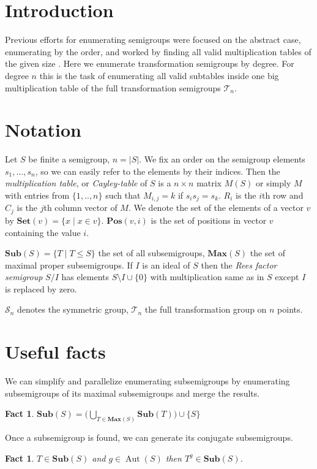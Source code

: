 \documentclass{amsart}
\newcommand{\cT}{{\mathcal T}}
\newcommand{\cS}{{\mathcal S}}
\newcommand{\Sub}{\mathbf{Sub}}
\newcommand{\Set}{\mathbf{Set}}
\newcommand{\Pos}{\mathbf{Pos}}
\newcommand{\Max}{\mathbf{Max}}
\DeclareMathOperator{\Aut}{Aut}
\theoremstyle{plain}
\newtheorem{fact}[theorem]{Fact}
\theoremstyle{definition}
\begin{document}
\tableofcontents
\section{Introduction}
Previous efforts for enumerating semigroups were focused on the abstract case, enumerating by the order, and worked by finding all valid multiplication tables of the given size \cite{monoidenum2009}.
Here we enumerate transformation semigroups by degree.
For degree $n$ this is the task of enumerating all valid subtables inside one big multiplication table of the  full transformation semigroups $\cT_n$.

\section{Notation}
Let $S$ be finite a semigroup, $n=|S|$.
We fix an order on the semigroup elements $s_1,\ldots, s_n$, so we can easily refer to the elements by their indices. 
Then the  \emph{multiplication table}, or \emph{Cayley-table} of $S$ is a $n\times n$ matrix $M(S)$ or simply $M$ with entries from $\{1,..,n\}$ such that $M_{i,j}=k$ if $s_is_j=s_k$.
$R_i$ is the $i$th row and $C_j$ is the $j$th column vector of $M$.
We denote the set of the elements of a vector $v$ by $\Set(v)=\{x\mid x\in v\}$.
$\Pos(v,i)$ is the set of positions in vector $v$ containing the value $i$.

$\Sub(S)=\big\{T\mid T\leq S \big\}$ the set of all subsemigroups, $\Max(S)$ the set of maximal proper subsemigroups.
If $I$ is an ideal of $S$ then the \emph{Rees factor semigroup} $S/I$ has elements $S\setminus I\cup\{0\}$ with multiplication same as in $S$ except $I$ is replaced by zero.

$\cS_n$ denotes the symmetric group, $\cT_n$ the full transformation group on $n$ points.
\section{Useful facts}
We can simplify and parallelize enumerating subsemigroups by enumerating subsemigroups of its maximal subsemigroups and merge the results.
\begin{fact}
$\Sub(S)=\big( \bigcup_{T\in \Max(S)}\Sub(T)\big)\cup \{S\}$
\end{fact}

Once a subsemigroup is found, we can generate its conjugate subsemigroups.
\begin{fact}
$T\in\Sub(S)$ and $g\in \Aut(S)$ then $T^g\in\Sub(S)$.%
\end{fact}
\end{document}
